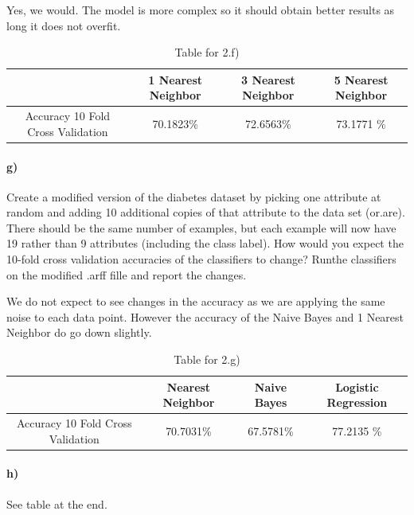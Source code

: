 \documentclass{article}
\begin{document}
Yes, we would. The model is more complex so it should obtain better results as long it does not overfit. 


\begin{table}[H]
    \begin{center}
    \begin{tabular}{|c|c|c|c|}
   \hline
        & 1 Nearest Neighbor & 3 Nearest Neighbor  & 5 Nearest Neighbor  \\ \hline
         Accuracy 10 Fold Cross Validation &  70.1823\%&72.6563\% &  73.1771 \%   \\ \hline
       
             
     
    \end{tabular}\caption{Table for 2.f)}
    \end{center}
\end{table}

\paragraph{g)}
Create a modified version of the diabetes dataset by picking one attribute at random and adding 10 additional copies of that attribute to the data set (or.are). There should be the same number of examples, but each example will now have 19 rather than 9 attributes (including the class label). How would you expect the 10-fold cross validation accuracies of the classifiers to change? Runthe classifiers on the modified .arff fille and report the changes.

We do not expect to see changes in the accuracy as we are applying the same noise to each data point. However the accuracy of the Naive Bayes and 1 Nearest Neighbor do go down slightly. 



\begin{table}[ht]
    \begin{center}
    \begin{tabular}{|c|c|c|c|}
   \hline
        & Nearest Neighbor & Naive Bayes & Logistic Regression \\ \hline
         Accuracy 10 Fold Cross Validation &  70.7031\%&67.5781\% &  77.2135 \%  \\ \hline
        \end{tabular}\caption{Table for 2.g)}
    \end{center}
\end{table}

\paragraph{h)} See table at the end.
\end{document}
